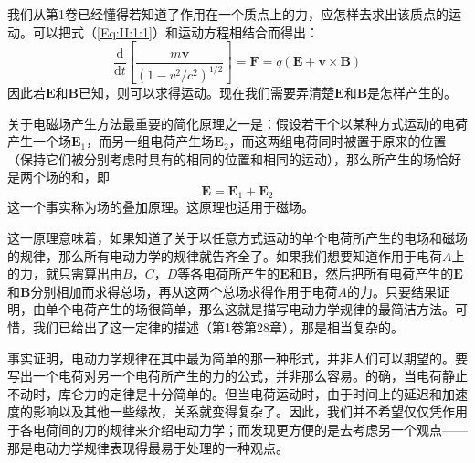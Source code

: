 我们从第1卷已经懂得若知道了作用在一个质点上的力，应怎样去求出该质点的运动。可以把式（\ref{Eq:II:1:1}）和运动方程相结合而得出：
\begin{equation}
    \label{Eq:II:1:2}
    \frac{\mathrm{d}}{\mathrm{d}t}\left[\frac{m\boldsymbol{v}}{(1-v^2/c^2)^{1/2}}\right]=\boldsymbol{F}=q(\boldsymbol{E}+\boldsymbol{v}\times\boldsymbol{B})
\end{equation}
因此若$\boldsymbol{E}$和$\boldsymbol{B}$已知，则可以求得运动。现在我们需要弄清楚$\boldsymbol{E}$和$\boldsymbol{B}$是怎样产生的。

关于电磁场产生方法最重要的简化原理之一是：假设若干个以某种方式运动的电荷产生一个场$\boldsymbol{E}_1$，而另一组电荷产生场$\boldsymbol{E}_2$，而这两组电荷同时被置于原来的位置（保持它们被分别考虑时具有的相同的位置和相同的运动），那么所产生的场恰好是两个场的和，即
\begin{equation}
    \label{Eq:II:1:3}
    \boldsymbol{E} = \boldsymbol{E}_1 + \boldsymbol{E}_2
\end{equation}
这一个事实称为场的叠加原理。这原理也适用于磁场。

这一原理意味着，如果知道了关于以任意方式运动的单个电荷所产生的电场和磁场的规律，那么所有电动力学的规律就告齐全了。如果我们想要知道作用于电荷$A$上的力，就只需算出由$B$，$C$，$D$等各电荷所产生的$\boldsymbol{E}$和$\boldsymbol{B}$，然后把所有电荷产生的$\boldsymbol{E}$和$\boldsymbol{B}$分别相加而求得总场，再从这两个总场求得作用于电荷$A$的力。只要结果证明，由单个电荷产生的场很简单，那么这就是描写电动力学规律的最简洁方法。可惜，我们已给出了这一定律的描述（第1卷第28章），那是相当复杂的。

事实证明，电动力学规律在其中最为简单的那一种形式，并非人们可以期望的。要写出一个电荷对另一个电荷所产生的力的公式，并非那么容易。的确，当电荷静止不动时，库仑力的定律是十分简单的。但当电荷运动时，由于时间上的延迟和加速度的影响以及其他一些缘故，关系就变得复杂了。因此，我们并不希望仅仅凭作用于各电荷间的力的规律来介绍电动力学；而发现更方便的是去考虑另一个观点——那是电动力学规律表现得最易于处理的一种观点。